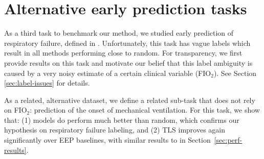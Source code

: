 \documentclass[nohyperref]{article}
\begin{document}
\begin{comment}
    \end{subfigure}
    \caption{{\textbf{AUPRC performance of temporal label smoothing combined with weighted cross-entropy}. (Left) Test set performance. (Right) Validation set performance.}}
    \label{fig:tls_wce}
\end{figure}

Finally, we investigated whether temporal label smoothing could be combined with other objective functions to leverage their respective added value and further improve prediction performance. {The performance of temporal label smoothing combined with a weighted cross-entropy objective is given in Figure \ref{fig:tls_wce}. Balanced reweighting per class results in a performance drop, as observed when applied to traditional cross-entropy (see Section \ref{sec:perf-results}, Figure \ref{fig:focal+weighted}). Another possible approach to combine these methods would be to leverage temporal information in sample re-weighting, and we reserve this investigation for further work. 

Similarly, no additional performance gains were obtained from combining multi-horizon prediction or focal loss with temporal label smoothing over using TLS with cross-entropy loss.}
\end{comment}

\newpage
\section{Alternative early prediction tasks}\label{appendix:resp}

As a third task to benchmark our method, we studied early prediction of respiratory failure, defined in \citet{yeche2021}. Unfortunately, this task has vague labels which result in all methods performing close to random. For transparency, we first provide results on this task and motivate our belief that this label ambiguity is caused by a very noisy estimate of a certain clinical variable (FIO$_2$). See Section \ref{sec:label-issues} for details. 

As a related, alternative dataset, we define a related sub-task that does not rely on FIO$_2$: prediction of the onset of mechanical ventilation. For this task, we show that: (1) models do perform much better than random, which confirms our hypothesis on respiratory failure labeling, and (2) TLS improves again significantly over EEP baselines, with similar results to in Section~\ref{sec:perf-results}.
\end{document}
